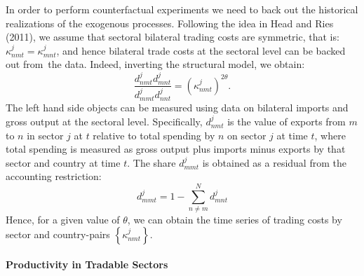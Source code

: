 \documentclass[12pt]{article}
\begin{document}
In order to perform counterfactual experiments we need to back out the
historical realizations of the exogenous processes. Following the idea in
Head and Ries (2011), we assume that sectoral bilateral trading costs are
symmetric, that is: $\kappa _{nmt}^{j}=\kappa _{mnt}^{j}$, and hence
bilateral trade costs at the sectoral level can be backed out from\ the
data. Indeed, inverting the structural model, we obtain: 
\begin{equation}
\frac{d_{nmt}^{j}d_{mnt}^{j}}{d_{mmt}^{j}d_{nnt}^{j}}=\left( \kappa
_{nmt}^{j}\right) ^{2\theta }.  \label{kappa}
\end{equation}%
The left hand side objects can be measured using data on bilateral imports
and gross output at the sectoral level. Specifically, $d_{nmt}^{j}$ is the
value of exports from $m$ to $n$ in sector $j$ at $t$ relative to total
spending by $n$ on sector $j$ at time $t$, where total spending is measured
as gross output plus imports minus exports by that sector and country at
time $t.$ The share $d_{mmt}^{j}$ is obtained as a residual from the
accounting restriction: 
\begin{equation*}
d_{mmt}^{j}=1-\sum\limits_{n\neq m}^{N}d_{mnt}^{j}
\end{equation*}%
Hence, for a given value of $\theta $, we can obtain the time series of
trading costs by sector and country-pairs $\left\{ \kappa _{nmt}^{j}\right\} 
$.

\paragraph{Productivity in Tradable Sectors}
\end{document}
